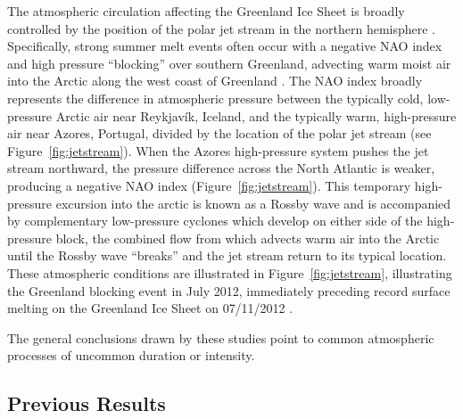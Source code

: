 \documentclass[11pt]{report}
\begin{document}
The atmospheric circulation affecting the Greenland Ice Sheet is broadly controlled by the position of the polar jet stream in the northern hemisphere \cite[][]{hanna2013,mattingly2018}. Specifically, strong summer melt events often occur with a negative NAO index and high pressure ``blocking'' over southern Greenland, advecting warm moist air into the Arctic along the west coast of Greenland \cite[][]{hanna2013,mattingly2018,mcmillan2016,bevis2018,getraerFall}. The NAO index broadly represents the difference in atmospheric pressure between the typically cold, low-pressure Arctic air near Reykjav\'ik, Iceland, and the typically warm, high-pressure air near Azores, Portugal, divided by the location of the polar jet stream (see Figure~\ref{fig:jetstream}). When the Azores high-pressure system pushes the jet stream northward, the pressure difference across the North Atlantic is weaker, producing a negative NAO index (Figure~\ref{fig:jetstream}). This temporary high-pressure excursion into the arctic is known as a Rossby wave and is accompanied by complementary low-pressure cyclones which develop on either side of the high-pressure block, the combined flow from which advects warm air into the Arctic until the Rossby wave ``breaks'' and the jet stream return to its typical location. These atmospheric conditions are illustrated in Figure~\ref{fig:jetstream}, illustrating the Greenland blocking event in July 2012, immediately preceding record surface melting on the Greenland Ice Sheet on 07/11/2012 \cite[][]{hanna2013,mattingly2018}.





The general conclusions drawn by these studies point to common atmospheric processes of uncommon duration or intensity. 





\subsection{Previous Results \label{sec:prevresults}}
\end{document}
